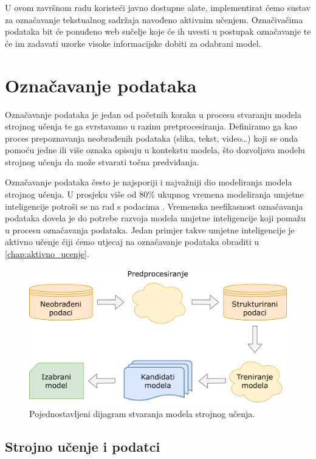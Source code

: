 \documentclass[times, utf8, zavrsni, numeric]{fer}
\begin{document}
U ovom završnom radu koristeći javno dostupne alate, implementirat ćemo sustav za označavanje tekstualnog sadržaja navođeno aktivnim učenjem.
Označivačima podataka bit će ponuđeno web sučelje koje će ih uvesti u postupak označavanje te će im zadavati uzorke visoke informacijske dobiti za odabrani model.

\chapter{Označavanje podataka}

Označavanje podataka je jedan od početnih koraka u procesu stvaranju modela strojnog učenja te ga svrstavamo u razinu pretprocesiranja. 
Definiramo ga kao proces prepoznavanja neobrađenih podataka (slika, tekst, video\dots) koji se onda pomoću jedne ili više oznaka opisuju u kontekstu modela, što dozvoljava modelu strojnog učenja da može stvarati točna predviđanja.

Označavanje podataka često je najsporiji i najvažniji dio modeliranja modela strojnog učenja. U prosjeku više od 80\% ukupnog vremena modeliranja umjetne inteligencije potroši se na rad s podacima \citep{cognilytica2019}. Vremenska neefikasnost označavanja podataka dovela je do potrebe razvoja modela umjetne inteligencije koji pomažu u procesu označavanja podataka. Jedan primjer takve umjetne inteligencije je aktivno učenje čiji ćemo utjecaj na označavanje podataka obraditi u \autoref{chap:aktivno_ucenje}.

\begin{figure}[h]
\centering
\includegraphics[width=\textwidth]{pictures/proces_strojnog_ucenja.png}
\caption{Pojednostavljeni dijagram stvaranja modela strojnog učenja.}
\label{proces_strojnog_ucenja}
\end{figure}

\section{Strojno učenje i podatci}
\end{document}
